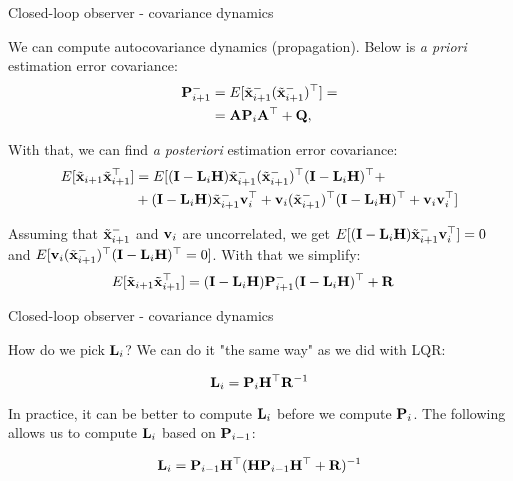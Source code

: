 \documentclass{beamer}
\begin{document}
\begin{frame}{Closed-loop observer - covariance dynamics}
	\begin{flushleft}
		
		We can compute autocovariance dynamics (propagation). Below is \emph{a priori} estimation error covariance:
		\begin{align*}
				\mathbf{P}_{i+1}^- 
				&= E[\Tilde{\mathbf{x}}_{i+1}^- (\Tilde{\mathbf{x}}_{i+1}^-)^\top] = \\
				&= \mathbf{A} \mathbf{P}_i \mathbf{A}^\top +\mathbf{Q},
		\end{align*}		
	
		With that, we can find \emph{a posteriori} estimation error covariance:
		\begin{align*}
		E[\Tilde{\mathbf{x}}_{i+1} \Tilde{\mathbf{x}}_{i+1}^\top] 
			&=
			E[ (\mathbf{I} - \mathbf{L}_i \mathbf{H}) \Tilde{\mathbf{x}}_{i+1}^- (\Tilde{\mathbf{x}}_{i+1}^-)^\top (\mathbf{I} - \mathbf{L}_i \mathbf{H})^\top + \\
			&+(\mathbf{I} - \mathbf{L}_i \mathbf{H}) \Tilde{\mathbf{x}}_{i+1}^- \mathbf{v}_i^\top +
			\mathbf{v}_i (\Tilde{\mathbf{x}}_{i+1}^-)^\top (\mathbf{I} - \mathbf{L}_i \mathbf{H})^\top +
			\mathbf{v}_i \mathbf{v}_i^\top]
		\end{align*}
		
		Assuming that $\Tilde{\mathbf{x}}_{i+1}^-$ and $\mathbf{v}_i$ are uncorrelated, we get $E[(\mathbf{I} - \mathbf{L}_i \mathbf{H}) \Tilde{\mathbf{x}}_{i+1}^- \mathbf{v}_i^\top] = 0$ and $E[\mathbf{v}_i (\Tilde{\mathbf{x}}_{i+1}^-)^\top (\mathbf{I} - \mathbf{L}_i \mathbf{H})^\top = 0]$. With that we simplify:
		\begin{align*}
			E[\Tilde{\mathbf{x}}_{i+1} \Tilde{\mathbf{x}}_{i+1}^\top] 
			&=
			(\mathbf{I} - \mathbf{L}_i \mathbf{H}) \mathbf{P}_{i+1}^- (\mathbf{I} - \mathbf{L}_i \mathbf{H})^\top +\mathbf{R} 
		\end{align*}
		
	\end{flushleft}
\end{frame}



\begin{frame}{Closed-loop observer - covariance dynamics}
	\begin{flushleft}
		
		How do we pick $\mathbf{L}_i$? We can do it "the same way" as we did with LQR:
		
		\begin{equation}
			\mathbf{L}_i = \mathbf{P}_i \mathbf{H}^\top \mathbf{R}^{-1}
		\end{equation}
	
		In practice, it can be better to compute $\mathbf{L}_i$ before we compute $\mathbf{P}_i$. The following allows us to compute $\mathbf{L}_i$ based on $\mathbf{P}_{i-1}$:
		
		\begin{equation}
			\mathbf{L}_i = \mathbf{P}_{i-1} \mathbf{H}^\top (\mathbf{H} \mathbf{P}_{i-1} \mathbf{H}^\top + \mathbf{R})^{-1}
		\end{equation}
	
	
	\end{flushleft}
\end{frame}
\end{document}
